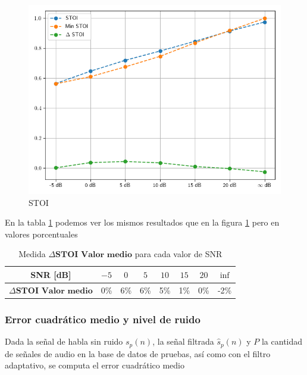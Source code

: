 \begin{figure}
	\centering
	\centerline{\includegraphics[scale=0.70]{images/ch7/objective_metrics/metric_STOI.png}}
	\caption{STOI}
	\label{fig:ch7_stoi_resume}
\end{figure}

En la tabla \ref{table:neural_filter_stoi_resume} podemos ver los mismos resultados que en la figura \ref{fig:ch7_stoi_resume} pero en valores porcentuales

\begin{table}[ht]
	\centering
	\begin{tabular}{ |c|c|c|c|c|c|c|c| } 
		\hline
		SNR [dB] & $-5$ & $0$ & $5$ & $10$ & $15$ & $20$ & $\inf$ \\ 
		\hline
		$\Delta \textbf{STOI Valor medio}$ & 0\%  & 6\%  & 6\% & 5\% & 1\% & 0\% & -2\% \\
		\hline
	\end{tabular}
	\caption{Medida $\Delta \textbf{STOI Valor medio}$ para cada valor de SNR}
	\label{table:neural_filter_stoi_resume}
\end{table}

\subsubsection{Error cuadrático medio y nivel de ruido}

Dada la señal de habla sin ruido $s_p(n)$, la señal filtrada $\hat{s}_p(n)$ y $P$ la cantidad de señales de audio en la base de datos de pruebas, así como con el filtro adaptativo, se computa el error cuadrático medio

